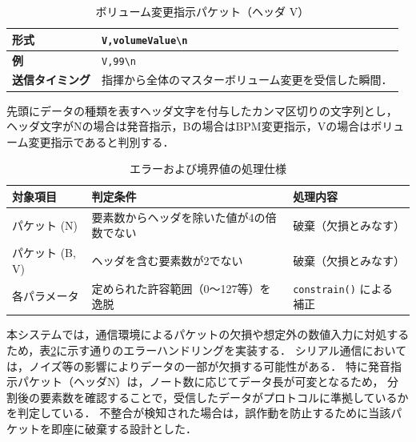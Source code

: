 \documentclass[lualatex,book,paper=a4paper,jafontsize=11.5pt,jafontscale=1.05]{jlreq}
\begin{document}
\begin{table}[H]
    \caption{ボリューム変更指示パケット（ヘッダ V）}
    \label{tab:headerV}
    \centering
    \begin{tabular}{|l|p{10cm}|}
        \hline
        \textbf{形式} & \texttt{V,volumeValue\textbackslash n} \\ \hline
        \textbf{例} & \texttt{V,99\textbackslash n} \\ \hline
        \textbf{送信タイミング} & 指揮から全体のマスターボリューム変更を受信した瞬間． \\ \hline
    \end{tabular}
\end{table}

先頭にデータの種類を表すヘッダ文字を付与したカンマ区切りの文字列とし，
ヘッダ文字がNの場合は発音指示，Bの場合はBPM変更指示，Vの場合はボリューム変更指示であると判別する．

\begin{table}[H]
    \centering
    \caption{エラーおよび境界値の処理仕様}
    \label{tab:error_handling}
    \begin{tabularx}{\textwidth}{|l|X|l|}
        \hline
        \textbf{対象項目} & \textbf{判定条件} & \textbf{処理内容} \\ \hline
        パケット (N) & 要素数からヘッダを除いた値が4の倍数でない & 破棄（欠損とみなす） \\ \hline
        パケット (B, V) & ヘッダを含む要素数が2でない & 破棄（欠損とみなす） \\ \hline
        各パラメータ & 定められた許容範囲（0～127等）を逸脱 & \texttt{constrain()} による補正 \\ \hline
    \end{tabularx}
\end{table}

本システムでは，通信環境によるパケットの欠損や想定外の数値入力に対処するため，表\ref{tab:error_handling}に示す通りのエラーハンドリングを実装する．
シリアル通信においては，ノイズ等の影響によりデータの一部が欠損する可能性がある．
特に発音指示パケット（ヘッダN）は，ノート数に応じてデータ長が可変となるため，
分割後の要素数を確認することで，受信したデータがプロトコルに準拠しているかを判定している．
不整合が検知された場合は，誤作動を防止するために当該パケットを即座に破棄する設計とした．
\end{document}
